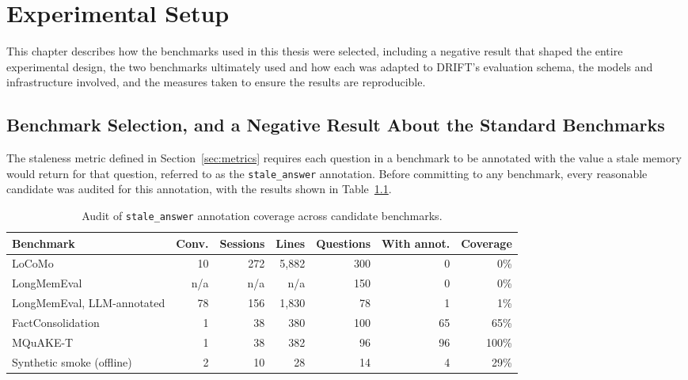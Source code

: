 \chapter{Experimental Setup}
\label{chap:experimental-setup}

This chapter describes how the benchmarks used in this thesis were selected, including a negative result that shaped the entire experimental design, the two benchmarks ultimately used and how each was adapted to DRIFT's evaluation schema, the models and infrastructure involved, and the measures taken to ensure the results are reproducible.

\section{Benchmark Selection, and a Negative Result About the Standard Benchmarks}
\label{sec:benchmark-selection}

The staleness metric defined in Section~\ref{sec:metrics} requires each question in a benchmark to be annotated with the value a stale memory would return for that question, referred to as the \texttt{stale\_answer} annotation. Before committing to any benchmark, every reasonable candidate was audited for this annotation, with the results shown in Table~\ref{tab:benchmark-audit}.

\begin{table}[H]
\centering
\caption{Audit of \texttt{stale\_answer} annotation coverage across candidate benchmarks.}
\label{tab:benchmark-audit}
\small
\setlength{\tabcolsep}{4pt}
\begin{tabular}{p{3.2cm}rrrrrr}
\toprule
Benchmark & Conv. & Sessions & Lines & Questions & With annot. & Coverage \\
\midrule
LoCoMo & 10 & 272 & 5{,}882 & 300 & 0 & 0\% \\
LongMemEval & n/a & n/a & n/a & 150 & 0 & 0\% \\
LongMemEval, LLM-annotated & 78 & 156 & 1{,}830 & 78 & 1 & 1\% \\
FactConsolidation & 1 & 38 & 380 & 100 & 65 & 65\% \\
MQuAKE-T & 1 & 38 & 382 & 96 & 96 & 100\% \\
Synthetic smoke (offline) & 2 & 10 & 28 & 14 & 4 & 29\% \\
\bottomrule
\end{tabular}
\end{table}

